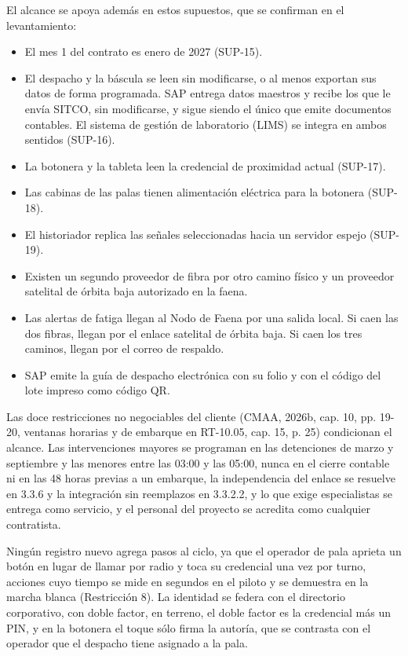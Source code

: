 \documentclass[subdoc]{../../comun/overfore}
\begin{document}
El alcance se apoya además en estos supuestos, que se confirman en el levantamiento:

\begin{itemize}
\item El mes 1 del contrato es enero de 2027 (SUP-15).
\item El despacho y la báscula se leen sin modificarse, o al menos exportan sus datos de forma programada. SAP entrega datos maestros y recibe los que le envía SITCO, sin modificarse, y sigue siendo el único que emite documentos contables. El sistema de gestión de laboratorio (LIMS) se integra en ambos sentidos (SUP-16).
\item La botonera y la tableta leen la credencial de proximidad actual (SUP-17).
\item Las cabinas de las palas tienen alimentación eléctrica para la botonera (SUP-18).
\item El historiador replica las señales seleccionadas hacia un servidor espejo (SUP-19).
\item Existen un segundo proveedor de fibra por otro camino físico y un proveedor satelital de órbita baja autorizado en la faena.
\item Las alertas de fatiga llegan al Nodo de Faena por una salida local. Si caen las dos fibras, llegan por el enlace satelital de órbita baja. Si caen los tres caminos, llegan por el correo de respaldo.
\item SAP emite la guía de despacho electrónica con su folio y con el código del lote impreso como código QR.
\end{itemize}

Las doce restricciones no negociables del cliente (CMAA, 2026b, cap. 10, pp. 19-20, ventanas horarias y de embarque en RT-10.05, cap. 15, p. 25) condicionan el alcance. Las intervenciones mayores se programan en las detenciones de marzo y septiembre y las menores entre las 03:00 y las 05:00, nunca en el cierre contable ni en las 48 horas previas a un embarque, la independencia del enlace se resuelve en 3.3.6 y la integración sin reemplazos en 3.3.2.2, y lo que exige especialistas se entrega como servicio, y el personal del proyecto se acredita como cualquier contratista.

Ningún registro nuevo agrega pasos al ciclo, ya que el operador de pala aprieta un botón en lugar de llamar por radio y toca su credencial una vez por turno, acciones cuyo tiempo se mide en segundos en el piloto y se demuestra en la marcha blanca (Restricción 8). La identidad se federa con el directorio corporativo, con doble factor, en terreno, el doble factor es la credencial más un PIN, y en la botonera el toque sólo firma la autoría, que se contrasta con el operador que el despacho tiene asignado a la pala.
\end{document}
